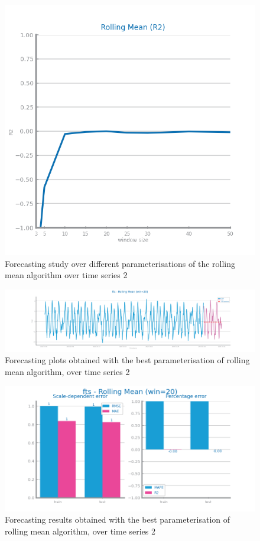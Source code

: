 \documentclass[10pt]{extarticle}
\begin{document}
\begin{figure}[H]
\centering\includegraphics[scale=0.4]{images/dataset2/time_series/fts_rollingmean_R2_study.png}
\caption{Forecasting study over different parameterisations of the rolling mean algorithm over time series 2}
\end{figure}

\begin{figure}[H]
\centering\includegraphics[scale=0.4]{images/dataset2/time_series/fts_rollingmean_R2_forecast.png}
\caption{Forecasting plots obtained with the best parameterisation of rolling mean algorithm, over time series 2}
\end{figure}

\begin{figure}[H]
\centering\includegraphics[scale=0.4]{images/dataset2/time_series/fts_rollingmean_R2_win20_eval.png}
\caption{Forecasting results obtained with the best parameterisation of rolling mean algorithm, over time series 2}
\end{figure}
\end{document}
